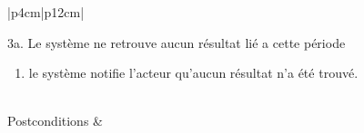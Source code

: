 \begin{longtable}{|p{4cm}|p{12cm}|}
                                    \begin{minipage}[t]{\linewidth}
                        3a. Le système ne retrouve aucun résultat lié a cette période  
                        \begin{enumerate}[nosep,after=\strut]
                              \item le système notifie l'acteur qu’aucun résultat n'a été trouvé.
                        \end{enumerate}
                    \end{minipage}
                    \\
                    \hline
                    Postconditions &   \\
                    \hline
                \caption{Description du cas d'utilisation « Rechercher période »}\\
            \end{longtable}    
    
